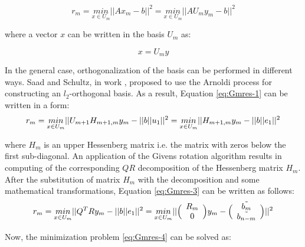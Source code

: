 \begin{equation} \label{eq:Gmres-1}
	r_{m} = \underset{x \in U_m}{min}||Ax_{m} - b||^2 =  \underset{x \in U_m}{min}||AU_m y_{m} - b||^2
\end{equation}

where a vector $x$ can be written in the basis $U_m$ as:

\begin{equation} \label{eq:Gmres-2}
		x = U_{m} y
\end{equation}

In the general case, orthogonalization of the basis can be performed in different ways. Saad and Schultz, in work \cite{sparse-la:gmrese-origin}, proposed to use the Arnoldi process for constructing an $l_2$-orthogonal basis. As a result, Equation \ref{eq:Gmres-1} can be written in a form:  \\

\begin{equation} \label{eq:Gmres-3}
	r_{m} = \underset{x \in U_m}{min}||U_{m+1}H_{m+1,m} y_{m} - ||b||u_1||^2 = \\
	\underset{x \in U_m}{min}||H_{m+1,m} y_{m} - ||b||e_1||^2 
\end{equation}

where $H_{m}$ is an upper Hessenberg matrix i.e. the matrix with zeros below the first sub-diagonal. An application of the Givens rotation algorithm results in computing of the corresponding $QR$ decomposition of the Hessenberg matrix $H_{m}$. After the substitution of matrix $H_{m}$ with the decomposition and some mathematical transformations, Equation \ref{eq:Gmres-3} can be written as follows:\\

 
\begin{equation} \label{eq:Gmres-4}
	r_{m} = \\
	\underset{x \in U_m}{min}||Q^{T}Ry_{m} - ||b||e_{1}||^2 = \\
	\underset{x \in U_m}{min}||\Big(\begin{array}{c c}R_m \\ 0 \\\end{array}\Big) y_{m} - \Big(\begin{array}{c c} \tilde{b_m} \\ \tilde{b_{n-m}} \\\end{array}\Big)||^2
\end{equation}

Now, the minimization problem \ref{eq:Gmres-4} can be solved as:\\

